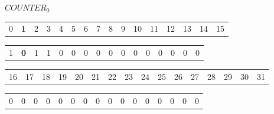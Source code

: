 \documentclass[a4paper,13pt]{article}
\theoremstyle{mytheor}
\begin{document}
\begin{mdframed}
    \vspace{0.25cm}
    $COUNTER_0$
    \begin{center}
        \begin{tabular}{p{0.4cm}p{0.4cm}p{0.4cm}p{0.4cm}p{0.4cm}p{0.4cm}p{0.4cm}p{0.4cm}p{0.4cm}p{0.4cm}p{0.4cm}p{0.4cm}p{0.4cm}p{0.4cm}p{0.4cm}p{0.4cm}}
            0 & \textbf{1} & 2 & 3 & 4 & 5 & 6 & 7 & 8 & 9 & 10 & 11 & 12 & 13 & 14 & 15 %
        \end{tabular}
        \begin{tabular}{|p{0.4cm}|p{0.4cm}|p{0.4cm}|p{0.4cm}|p{0.4cm}|p{0.4cm}|p{0.4cm}|p{0.4cm}|p{0.4cm}|p{0.4cm}|p{0.4cm}|p{0.4cm}|p{0.4cm}|p{0.4cm}|p{0.4cm}|p{0.4cm}|}
            \hline
            1 & \textbf{0} & 1 & 1 & 0 & 0 & 0 & 0 & 0 & 0 & 0 & 0 & 0 & 0 & 0 & 0 \\ \cline{1-16} %
        \end{tabular}
        \begin{tabular}{p{0.4cm}p{0.4cm}p{0.4cm}p{0.4cm}p{0.4cm}p{0.4cm}p{0.4cm}p{0.4cm}p{0.4cm}p{0.4cm}p{0.4cm}p{0.4cm}p{0.4cm}p{0.4cm}p{0.4cm}p{0.4cm}}
            16 & 17 & 18 & 19 & 20 & 21 & 22 & 23 & 24 & 25 & 26 & 27 & 28 & 29 & 30 & 31 %
        \end{tabular}
        \begin{tabular}{|p{0.4cm}|p{0.4cm}|p{0.4cm}|p{0.4cm}|p{0.4cm}|p{0.4cm}|p{0.4cm}|p{0.4cm}|p{0.4cm}|p{0.4cm}|p{0.4cm}|p{0.4cm}|p{0.4cm}|p{0.4cm}|p{0.4cm}|p{0.4cm}|}
            \hline
            0 & 0 & 0 & 0 & 0 & 0 & 0 & 0 & 0 & 0 & 0 & 0 & 0 & 0 & 0 & 0 \\ \cline{1-16} %
        \end{tabular}
    \end{center}


\end{mdframed}
\end{document}

